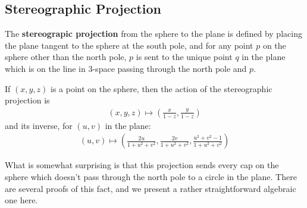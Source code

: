 \subsection{Stereographic Projection}


\begin{definition}
  The \textbf{stereograpic projection} from the sphere to the plane is
  defined by placing the plane tangent to the sphere at the south
  pole, and for any point $p$ on the sphere other than the north pole,
  $p$ is sent to the unique point $q$ in the plane which is on the
  line in 3-space passing through the north pole and $p$.

  If $(x,y,z)$ is a point on the sphere, then the action of the
  stereographic projection is
  \begin{align*}
    (x,y,z)\mapsto \left(\frac{x}{1-z},\frac{y}{1-z}\right)
  \end{align*}
  and its inverse, for $(u,v)$ in the plane:
  \begin{align*}
    (u,v)\mapsto \left( \frac{2u}{1+u^2+v^2},\frac{2v}{1+u^2+v^2},
    \frac{u^2+v^2-1}{1+u^2+v^2}   \right)
  \end{align*}
\end{definition}

What is somewhat surprising is that this projection sends every cap on
the sphere which doesn't pass through the north pole to a circle in
the plane.  There are several proofs of this fact, and we present
a rather straightforward algebraic one here.


